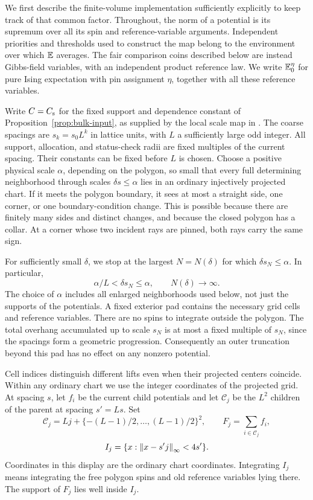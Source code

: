 We first describe the finite-volume implementation sufficiently
explicitly to keep track of that common factor.  Throughout, the norm
of a potential is its supremum over all its spin and reference-variable
arguments.  Independent priorities and thresholds used to construct the
map belong to the environment over which $\mathbb E$ averages.  The fair
comparison coins described below are instead Gibbs-field variables,
with an independent product reference law.  We write $\mathbb E_0^\eta$ for
pure Ising expectation with pin assignment $\eta$, together with all
these reference variables.

Write $C=C_{\rm s}$ for the fixed support and dependence constant of
Proposition~\ref{prop:bulk-input}, as supplied by the local scale map in
\cite[Section~``An exact local change of scale'']{Q}.  The coarse
spacings are $s_k=s_0L^k$ in lattice units, with $L$ a sufficiently large
odd integer.  All support, allocation, and status-check radii are fixed
multiples of the current spacing.  Their constants can be fixed before
$L$ is chosen.  Choose a positive physical scale $\alpha$, depending
on the polygon, so small that every full determining neighborhood
through scales $\delta s\le\alpha$ lies in an ordinary injectively
projected chart.  If it meets the polygon boundary, it sees at most a
straight side, one corner, or one boundary-condition change.  This is
possible because there are finitely many sides and distinct changes,
and because the closed polygon has a collar.  At a corner whose two
incident rays are pinned, both rays carry the same sign.

For sufficiently small $\delta$, we stop at the largest $N=N(\delta)$ for which
$\delta s_N\le\alpha$.  In particular,
\begin{equation}\label{eq:polygon-terminal-scale}
 \alpha/L<\delta s_N\le\alpha,
 \qquad N(\delta)\longrightarrow\infty.
\end{equation}
The choice of $\alpha$ includes all enlarged neighborhoods used below,
not just the supports of the potentials.  A fixed exterior pad contains
the necessary grid cells and reference variables.  There are no spins
to integrate outside the polygon.  The total overhang accumulated up to
scale $s_N$ is at most a fixed multiple of $s_N$, since the spacings
form a geometric progression.  Consequently an outer truncation beyond
this pad has no effect on any nonzero potential.

Cell indices distinguish different lifts even when their projected
centers coincide.  Within any ordinary chart we use the integer
coordinates of the projected grid.  At spacing $s$, let $f_i$ be the current child potentials and let
$\mathcal C_j$ be the $L^2$ children of the parent at spacing $s'=Ls$.
Set
\[
 \mathcal C_j=Lj+\{-(L-1)/2,\ldots,(L-1)/2\}^2,
 \qquad F_j=\sum_{i\in\mathcal C_j}f_i,
\]
\[
 I_j=\{x:\left\lVert x-s'j\right\rVert_\infty<4s'\}.
\]
Coordinates in this display are the ordinary chart coordinates.
Integrating $I_j$ means integrating the free polygon spins and old
reference variables lying there.  The support of $F_j$ lies well inside
$I_j$.

